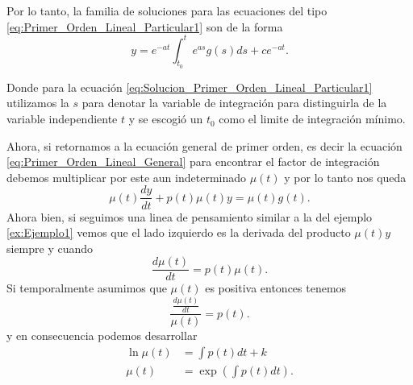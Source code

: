 \documentclass{report}
\begin{document}
Por lo tanto, la familia de soluciones para las ecuaciones del tipo \ref{eq:Primer_Orden_Lineal_Particular1} son de la forma
\begin{equation}
  \label{eq:Solucion_Primer_Orden_Lineal_Particular1}
  y = e^{-at}\int_{t_0}^{t}  e^{as}g\left( s \right) ds + ce^{-at}
.\end{equation}

Donde para la ecuación \ref{eq:Solucion_Primer_Orden_Lineal_Particular1} utilizamos la $s$ para denotar la variable de integración para distinguirla de la variable independiente $t$ y se escogió un $t_0$ como el limite de integración mínimo.


Ahora, si retornamos a la ecuación general de primer orden, es decir la ecuación \ref{eq:Primer_Orden_Lineal_General} para encontrar el factor de integración debemos multiplicar por este aun indeterminado $\mu\left( t \right) $ y por lo tanto nos queda \[
\mu\left( t \right) \frac{dy}{dt} + p\left( t \right) \mu\left( t \right) y = \mu\left( t \right) g\left( t \right) 
.\] Ahora bien, si seguimos una linea de pensamiento similar a la del ejemplo \ref{ex:Ejemplo1} vemos que el lado izquierdo es la derivada del producto  $\mu\left( t \right) y$ siempre y cuando \[
\frac{d\mu\left( t \right) }{dt} = p\left( t \right) \mu\left( t \right) 
.\] Si temporalmente asumimos que $\mu\left( t \right) $ es positiva entonces tenemos \[
\frac{\frac{d\mu\left( t \right) }{dt}}{\mu\left( t \right) } = p\left( t \right) 
.\]  y en consecuencia podemos desarrollar 
\begin{align*}
  \ln\mu\left( t \right) &= \int p\left( t \right) dt + k \\
  \mu\left( t \right) &= \exp\left( \int p\left( t \right) dt \right)
.\end{align*}
\end{document}
